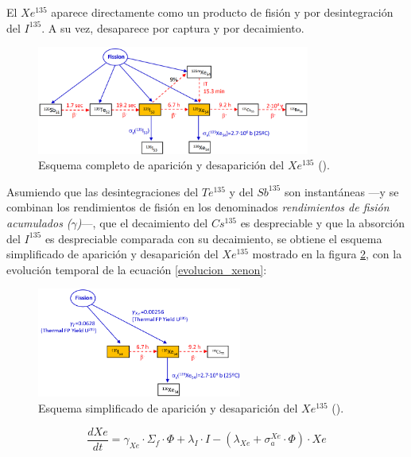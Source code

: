 El $Xe^{135}$ aparece directamente como un producto de fisión y por desintegración del $I^{135}$. A su vez, desaparece por captura y por decaimiento.

\begin{figure}[h]
  \centering
  \includegraphics[width=0.8\textwidth]{content/figures/esquema_xenon.png}
  \caption{Esquema completo de aparición y desaparición del $Xe^{135}$ (\cite{apuntes_centrales}).}
  \label{fig:esquema_xenon}
\end{figure}

Asumiendo que las desintegraciones del $Te^{135}$ y del $Sb^{135}$ son instantáneas ---y se combinan los rendimientos de fisión en los denominados \textit{rendimientos de fisión acumulados ($\gamma$)}---, que el decaimiento del $Cs^{135}$ es despreciable y que la absorción del $I^{135}$ es despreciable comparada con su decaimiento, se obtiene el esquema simplificado de aparición y desaparición del $Xe^{135}$ mostrado en la figura \ref{fig:esquema_xenon_simplificado}, con la evolución temporal de la ecuación \ref{evolucion_xenon}:

\begin{figure}[!h]
  \centering
  \includegraphics[width=0.6\textwidth]{content/figures/esquema_xenon_simplificado.png}
  \caption{Esquema simplificado de aparición y desaparición del $Xe^{135}$ (\cite{apuntes_centrales}).}
  \label{fig:esquema_xenon_simplificado}
\end{figure}

\begin{equation} \label{evolucion_xenon}
  \frac{d X e}{d t}=\gamma_{X e} \cdot \Sigma_f \cdot \Phi+\lambda_I \cdot I-\left(\lambda_{X e}+\sigma_a^{X e} \cdot \Phi\right) \cdot X e
\end{equation}

